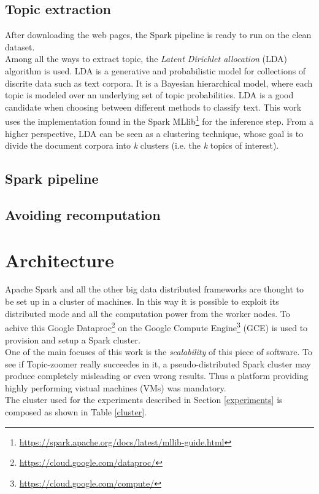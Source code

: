 \documentclass{sig-alternate-05-2015}
\begin{document}
\subsection{Topic extraction}
After downloading the web pages, the Spark pipeline is ready to run on the clean dataset.\\
Among all the ways to extract topic, the \emph{Latent Dirichlet allocation}\cite{lda} (LDA) algorithm is used. LDA is a generative and probabilistic model for collections of discrite data such as text corpora. It is a Bayesian hierarchical model, where each topic is modeled over an underlying set of topic probabilities. LDA is a good candidate when choosing between different methods to classify text. This work uses the implementation found in the Spark MLlib\footnote{\url{https://spark.apache.org/docs/latest/mllib-guide.html}} for the inference step. From a higher perspective, LDA can be seen as a clustering technique, whose goal is to divide the document corpora into \emph{k} clusters (i.e. the \emph{k} topics of interest).
\subsection{Spark pipeline}
\subsection{Avoiding recomputation}


\section{Architecture}
Apache Spark and all the other big data distributed frameworks are thought to be set up in a cluster of machines. In this way it is possible to exploit its distributed mode and all the computation power from the worker nodes. To achive this Google Dataproc\footnote{\url{https://cloud.google.com/dataproc/}} on the Google Compute Engine\footnote{\url{https://cloud.google.com/compute/}} (GCE) is used to provision and setup a Spark cluster.\\

One of the main focuses of this work is the \emph{scalability} of this piece of software. To see if Topic-zoomer really succeedes in it, a pseudo-distributed Spark cluster may produce completely misleading or even wrong results. Thus a platform providing highly performing vistual machines (VMs) was mandatory.\\
The cluster used for the experiments described in Section \ref{experiments} is composed as shown in Table \ref{cluster}.
\end{document}
